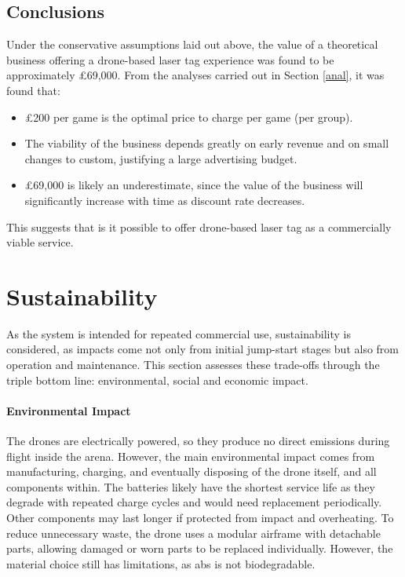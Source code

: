 \documentclass{report_template_oxford}
\begin{document}
\subsection{Conclusions}
Under the conservative assumptions laid out above, the value of a theoretical business offering a drone-based laser tag experience was found to be approximately £69,000. From the analyses carried out in Section \ref{anal}, it was found that:
\begin{itemize}
    \item £200 per game is the optimal price to charge per game (per group).
    \item The viability of the business depends greatly on early revenue and on small changes to custom, justifying a large advertising budget.
    \item £69,000 is likely an underestimate, since the value of the business will significantly increase with time as discount rate decreases. 
\end{itemize}
\noindent This suggests that is it possible to offer drone-based laser tag as a commercially viable service.

\newpage


\section{Sustainability} %
\label{sustainability}

As the system is intended for repeated commercial use, sustainability is considered, as impacts come not only from initial jump-start stages but also from operation and maintenance. This section assesses these trade-offs through the triple bottom line: environmental, social and economic impact.

\paragraph{Environmental Impact}

The drones are electrically powered, so they produce no direct emissions during flight inside the arena. However, the main environmental impact comes from manufacturing, charging, and eventually disposing of the drone itself, and all components within. The batteries likely have the shortest service life as they degrade with repeated charge cycles and would need replacement periodically. Other components may last longer if protected from impact and overheating. To reduce unnecessary waste, the drone uses a modular airframe with detachable parts, allowing damaged or worn parts to be replaced individually. However, the material choice still has limitations, as \gls{abs} is not biodegradable.
\end{document}
